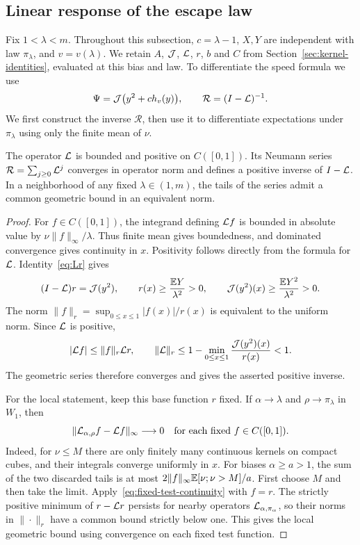 \subsection{Linear response of the escape law}\label{sec:linear-response}
Fix $1<\lambda<m$. Throughout this subsection, $c=\lambda-1$, $X,Y$ are independent with law $\pi_\lambda$, and $v=v(\lambda)$. We retain $A$, $\mathcal J$, $\mathcal L$, $r$, $b$ and $C$ from Section~\ref{sec:kernel-identities}, evaluated at this bias and law. To differentiate the speed formula we use
\begin{equation}\label{eq:full-response-defs}
 \Psi=\mathcal J\bigl(y^2+c h_v(y)\bigr),\qquad
 \mathcal R=(I-\mathcal L)^{-1}.
\end{equation}
We first construct the inverse $\mathcal R$, then use it to differentiate expectations under $\pi_\lambda$ using only the finite mean of $\nu$.

\begin{lemma}\label{lem:positive-inverse}
The operator $\mathcal L$ is bounded and positive on $C([0,1])$. Its Neumann series $\mathcal R=\sum_{j\ge0}\mathcal L^j$ converges in operator norm and defines a positive inverse of $I-\mathcal L$. In a neighborhood of any fixed $\lambda\in(1,m)$, the tails of the series admit a common geometric bound in an equivalent norm.
\end{lemma}
\begin{proof}
For $f\in C([0,1])$, the integrand defining $\mathcal L f$ is bounded in absolute value by $\nu\|f\|_\infty/\lambda$. Thus finite mean gives boundedness, and dominated convergence gives continuity in $x$. Positivity follows directly from the formula for $\mathcal L$. Identity~\eqref{eq:Lr} gives
\[
 (I-\mathcal L)r=\mathcal J(y^2),\qquad
 r(x)\ge\frac{\mathbb E Y}{\lambda^2}>0,\qquad
 \mathcal J(y^2)(x)\ge\frac{\mathbb E Y^2}{\lambda^2}>0.
\]
The norm $\|f\|_r=\sup_{0\le x\le1}|f(x)|/r(x)$ is equivalent to the uniform norm. Since $\mathcal L$ is positive,
\[
 |\mathcal L f|\le\|f\|_r\mathcal L r,
 \qquad \|\mathcal L\|_r\le
 1-\min_{0\le x\le1}\frac{\mathcal J(y^2)(x)}{r(x)}<1.
\]
The geometric series therefore converges and gives the asserted positive inverse.

For the local statement, keep this base function $r$ fixed. If $\alpha\to\lambda$ and $\rho\to\pi_\lambda$ in $W_1$, then
\begin{equation}\label{eq:fixed-test-continuity}
 \|\mathcal L_{\alpha,\rho}f-\mathcal L f\|_\infty\longrightarrow0
 \quad\text{for each fixed }f\in C([0,1]).
\end{equation}
Indeed, for $\nu\le M$ there are only finitely many continuous kernels on compact cubes, and their integrals converge uniformly in $x$. For biases $\alpha\ge a>1$, the sum of the two discarded tails is at most $2\|f\|_\infty\mathbb E[\nu;\nu>M]/a$. First choose $M$ and then take the limit. Apply~\eqref{eq:fixed-test-continuity} with $f=r$. The strictly positive minimum of $r-\mathcal L r$ persists for nearby operators $\mathcal L_{\alpha,\pi_\alpha}$, so their norms in $\|\cdot\|_r$ have a common bound strictly below one. This gives the local geometric bound using convergence on each fixed test function.
\end{proof}


